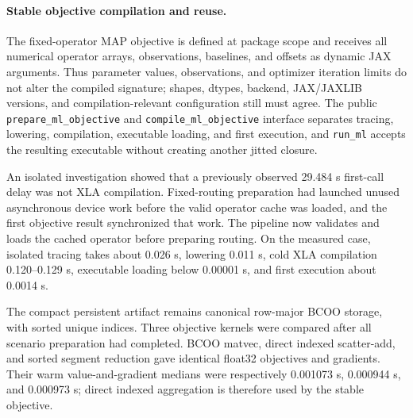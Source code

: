 \paragraph{Stable objective compilation and reuse.}
The fixed-operator MAP objective is defined at package scope and receives all
numerical operator arrays, observations, baselines, and offsets as dynamic JAX
arguments. Thus parameter values, observations, and optimizer iteration limits
do not alter the compiled signature; shapes, dtypes, backend, JAX/JAXLIB
versions, and compilation-relevant configuration still must agree. The public
\texttt{prepare\_ml\_objective} and \texttt{compile\_ml\_objective} interface
separates tracing, lowering, compilation, executable loading, and first
execution, and \texttt{run\_ml} accepts the resulting executable without
creating another jitted closure.

An isolated investigation showed that a previously observed 29.484 s first-call
delay was not XLA compilation. Fixed-routing preparation had launched unused
asynchronous device work before the valid operator cache was loaded, and the
first objective result synchronized that work. The pipeline now validates and
loads the cached operator before preparing routing. On the measured case, isolated
tracing takes about 0.026 s, lowering 0.011 s, cold XLA compilation
0.120--0.129 s, executable loading below 0.00001 s, and first execution about
0.0014 s.

The compact persistent artifact remains canonical row-major BCOO storage, with
sorted unique indices. Three objective kernels were compared after all scenario
preparation had completed. BCOO matvec, direct indexed scatter-add, and sorted
segment reduction gave identical float32 objectives and gradients. Their warm
value-and-gradient medians were respectively 0.001073 s, 0.000944 s, and
0.000973 s; direct indexed aggregation is therefore used by the stable
objective.

